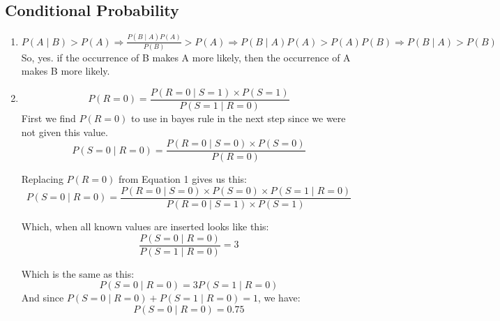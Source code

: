 \documentclass[a4paper]{article}
\begin{document}
    \subsection{Conditional Probability}
        \begin{enumerate}[1.]
            \item $P(A \mid B)>P(A) \Rightarrow \frac{P(B \mid A) P(A)}{P(B)} > P(A) \Rightarrow P(B \mid A) P(A) > P(A) P(B) \Rightarrow P(B\mid A) > P(B)$
                So, yes. if the occurrence of B makes A more likely, then the occurrence of A makes B more likely.
            \item
                \begin{equation}
                    P(R=0) = \frac{P(R=0 \mid S=1) \times P(S=1)}{P(S=1 \mid R=0)}
                \end{equation}
                First we find $P(R=0)$ to use in bayes rule in the next step since we were not given this value.
                \begin{equation}
                    P(S=0 \mid R=0) = \frac{P(R=0 \mid S=0) \times P(S=0)}{P(R=0)}
                \end{equation}

                Replacing $P(R=0)$ from Equation 1 gives us this:
                \begin{equation}
                    P(S=0 \mid R=0) = \frac{P(R=0 \mid S=0) \times P(S=0) \times P(S=1 \mid R=0)}{P(R=0 \mid S=1) \times P(S=1)}
                \end{equation}

                Which, when all known values are inserted looks like this:
                \begin{equation}
                    \frac{P(S=0 \mid R=0)}{P(S=1 \mid R=0)} = 3
                \end{equation}

                Which is the same as this:
                \begin{equation}
                    P(S=0 \mid R=0) = 3P(S=1 \mid R=0)
                \end{equation}
                And since $P(S=0 \mid R=0) + P(S=1 \mid R=0) = 1$, we have:
                \begin{equation}
                    P(S=0 \mid R=0) = 0.75
                \end{equation}
        \end{enumerate}
\end{document}
